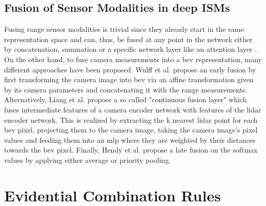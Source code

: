 \subsection{Fusion of Sensor Modalities in deep ISMs}
\label{subsec:deep_ism_fusion}
Fusing range sensor modalities is trivial since they already start in the same representation space and can, thus, be fused at any point in the network either by concatenation, summation or a specific network layer like an attention layer \cite{vaswani2017attention}. On the other hand, to fuse camera measurements into a \gls{bev} representation, many different approaches have been proposed. Wulff et al. propose an early fusion by first transforming the camera image into \gls{bev} via an affine transformation given by its camera parameters and concatenating it with the range measurements. Alternatively, Liang et al. \cite{liang2018deep} propose a so called "continuous fusion layer" which fuses intermediate features of a camera encoder network with features of the lidar encoder network. This is realized by extracting the k nearest lidar point for each \gls{bev} pixel, projecting them to the camera image, taking the camera image's pixel values and feeding them into an \gls{mlp} where they are weighted by their distances towards the \gls{bev} pixel. Finally, Hendy et al. \cite{hendy2020fishing} propose a late fusion on the softmax values by applying either average or priority pooling.    
%
\section{Evidential Combination Rules}
\label{sec:evidence_theory}


%
